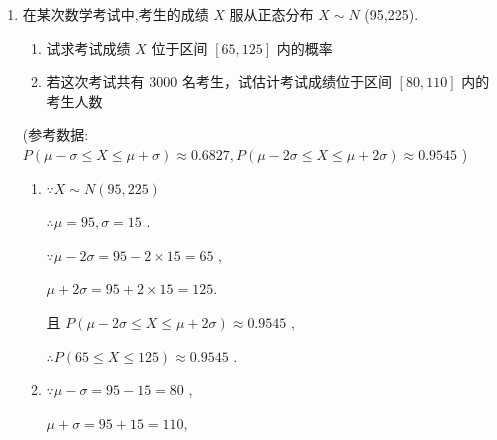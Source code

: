 \begin{enumerate}
\begin{enumerate}
\begin{jieda}
            $\because p\left( k\right)  = P\left( {\mu  - {k\sigma } \leq  X \leq  \mu  + {k\sigma }}\right) ,p\left( {0.75}\right)  \approx  {0.547}$
            
            $\therefore P\left( {{57} \leq  X \leq  {90}}\right) = p\left( {0.75}\right)  \approx  {0.547}$ ,
            
            $P\left( {X \geq  {90}}\right)  = {0.5} \times  \left( {1 - {0.547}}\right)  = {0.2265},$
            
            $\therefore$ 该校及格人数为 ${0.2265} \times  {1200} \approx  {272}$ (人)
        \end{jieda}
        \item 在某次数学考试中,考生的成绩 $X$ 服从正态分布 $X \sim  N$ (95,225).
        \begin{enumerate}
            \item 试求考试成绩 $X$ 位于区间 $\left\lbrack  {{65},{125}}\right\rbrack$ 内的概率
            \item 若这次考试共有 3000 名考生，试估计考试成绩位于区间 $[80,110]$ 内的考生人数
        \end{enumerate}
        (参考数据: $P\left( {\mu  - \sigma  \leq  X \leq  \mu  + \sigma }\right)  \approx  {0.6827},P\left( {\mu  - {2\sigma } \leq  X \leq  \mu  + {2\sigma }}\right)  \approx  {0.9545}$ )
        
        \begin{jieda}
            \begin{enumerate}
                \item $\because X \sim  N\left( {{95},{225}}\right)$
                
                $\therefore \mu  = {95},\sigma  = {15}$ .
                
                $\because \mu  - {2\sigma } = {95} - 2 \times  {15} = {65}$ ,
                
                $\mu  + {2\sigma } = {95} + 2 \times  {15} = {125}.$
                
                且 $P\left( {\mu  - {2\sigma } \leq  X \leq  \mu  + {2\sigma }}\right)  \approx  {0.9545}$ ,
                
                $\therefore P\left( {{65} \leq  X \leq  {125}}\right)  \approx  {0.9545}$ .
                
                \item $\because \mu  - \sigma  = {95} - {15} = {80}$ ,
                
                $\mu  + \sigma  = {95} + {15} = {110},$
                

\end{enumerate}
\end{jieda}
\end{enumerate}
\end{enumerate}
